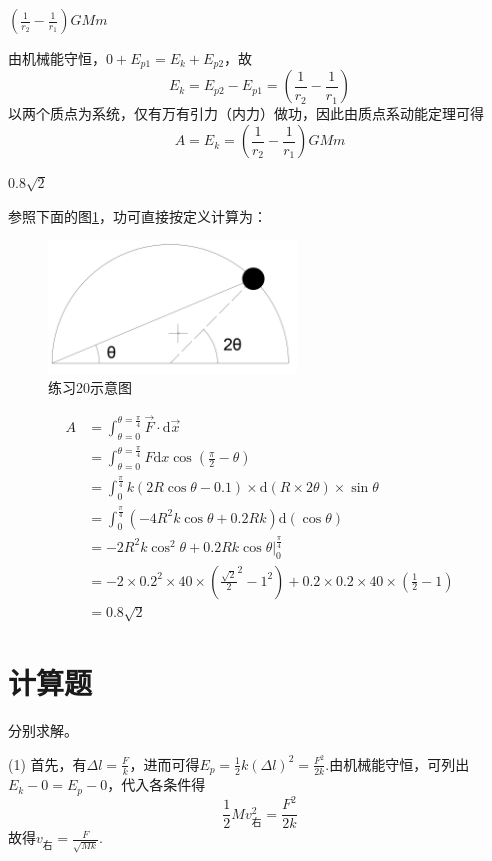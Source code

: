 \documentclass[b5paper,opensource,sourcefont,parskip]{qyxf-book}
\newcommand{\di}[1]{\mathrm{d}#1}
\begin{document}
$\left(\frac{1}{r_2}-\frac{1}{r_1}\right)GMm$ 

\solve 由机械能守恒，$0+E_{p1}=E_k+E_{p2}$，故
\[E_k=E_{p2}-E_{p1}=\left(\frac{1}{r_2}-\frac{1}{r_1}\right)\]
以两个质点为系统，仅有万有引力（内力）做功，因此由质点系动能定理可得
\[A=E_k=\left(\frac{1}{r_2}-\frac{1}{r_1}\right)GMm\]

$0.8\sqrt{2}$

\solve 参照下面的图\ref{fig:t20}，功可直接按定义计算为：

\begin{figure}[htbp]
	\centering
	\includegraphics[height=100pt]{Chp2_illus1.png}
	\caption{练习20示意图}\label{fig:t20}
\end{figure}

\begin{align*}
A&=\int_{\theta=0}^{\theta=\frac{\pi}{4}}{\vec{F}}\cdot\di{\vec{x}}\\
&=\int_{\theta=0}^{\theta=\frac{\pi}{4}}F\di{x}\cos\left(\frac{\pi}{2}-\theta\right)\\
&=\int_{0}^{\frac{\pi}{4}}k(2R\cos\theta-0.1)\times\di{(R\times 2\theta)}\times\sin\theta\\
&=\int_{0}^{\frac{\pi}{4}}(-4R^2k\cos\theta+0.2Rk)\di{(\cos\theta)}\\
&=-2R^2k\cos^2\theta+0.2Rk\cos\theta\left.\right|_0^{\frac{\pi}{4}}\\
&=-2\times 0.2^2\times 40\times({\frac{\sqrt{2}}{2}}^2-1^2)+0.2\times 0.2\times 40\times(\frac{1}{2}-1)\\
&=0.8\sqrt{2}
\end{align*}


\section{计算题}

\solve 分别求解。

(1) 首先，有$\Delta l=\frac{F}{k}$，进而可得$E_p=\frac{1}{2}k(\Delta l)^2=\frac{F^2}{2k}$.由机械能守恒，可列出
$E_k-0=E_p-0$，代入各条件得
\[\frac{1}{2}Mv_{\text{右}}^2=\frac{F^2}{2k}\]
故得$v_{\text{右}}=\frac{F}{\sqrt{Mk}}$.
\end{document}
